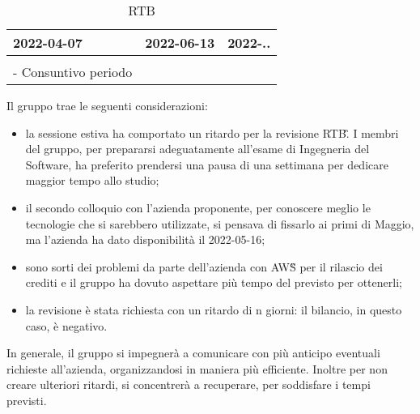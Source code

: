 {{\begin{longtable}{C{.4\freewidth} C{.4\freewidth} C{.4\freewidth}}
        2022-04-07 & 2022-06-13 & 2022-.. \\
        \bottomrule
        \\
        \caption{RTB} - Consuntivo periodo}
        \end{longtable}
        Il gruppo trae le seguenti considerazioni:
        \begin{itemize}
            \item la sessione estiva ha comportato un ritardo per la revisione RTB\G. I membri del gruppo,
                per prepararsi adeguatamente all'esame di Ingegneria del Software, 
                ha preferito prendersi una pausa di una settimana per dedicare maggior tempo allo studio;
            \item  il secondo colloquio con l'azienda proponente, per conoscere meglio le tecnologie che si sarebbero 
                  utilizzate, si pensava di fissarlo ai primi di Maggio, ma l'azienda ha dato disponibilità 
                  il 2022-05-16;
            \item sono sorti dei problemi da parte dell'azienda con AWS\G{} per il rilascio dei crediti e il gruppo ha dovuto aspettare 
                  più tempo del previsto per ottenerli;
            \item la revisione è stata richiesta con un ritardo di n giorni: il bilancio, in questo caso, è negativo.
        \end{itemize}
        In generale, il gruppo si impegnerà a comunicare con più anticipo eventuali richieste all'azienda, organizzandosi 
        in maniera più efficiente. Inoltre per non creare ulteriori ritardi, si concentrerà a recuperare, per soddisfare i tempi previsti. 
    }
 }
